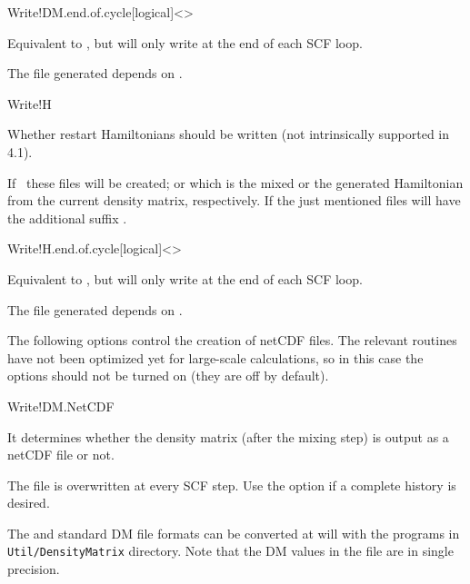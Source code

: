 \begin{fdfentry}{Write!DM.end.of.cycle}[logical]<>

  Equivalent to , but will only write at the end of each
  SCF loop.

  \note The file generated depends on .

\end{fdfentry}  

\begin{fdflogicalF}{Write!H}

  Whether restart Hamiltonians should be written (not intrinsically
  supported in 4.1). 

  If \fdftrue\ these files will be created;  or
   which is the mixed or the generated Hamiltonian from
  the current density matrix, respectively. If
   the just mentioned files will have the
  additional suffix .
  
\end{fdflogicalF}

\begin{fdfentry}{Write!H.end.of.cycle}[logical]<>

  Equivalent to , but will only write at the end of each
  SCF loop.

  \note The file generated depends on .

\end{fdfentry}  

The following options control the creation of netCDF files. The
relevant routines have not been optimized yet for large-scale
calculations, so in this case the options should not be turned on
(they are off by default).


\begin{fdflogicalT}{Write!DM.NetCDF}
  
  It determines whether the density matrix (after the mixing step) is
  output as a  netCDF file or not.

  The file is overwritten at every SCF step. Use the
   option if a complete history is
  desired.

  The  and standard DM file formats can be converted at
  will with the programs in \texttt{Util/DensityMatrix}
  directory. Note that the DM values in the  file are in
  single precision.

\end{fdflogicalT}

